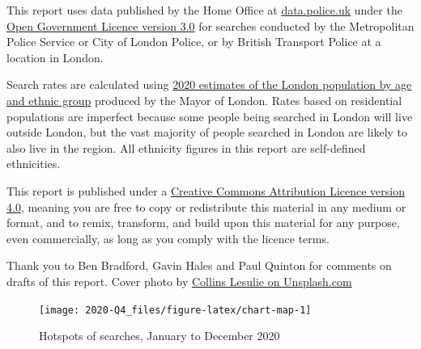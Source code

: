 \documentclass[
  a4paper,
  twoside, 11pt]{article}
\begin{document}
This report uses data published by the Home Office at \href{https://data.police.uk/}{data.police.uk} under the \href{https://www.nationalarchives.gov.uk/doc/open-government-licence/version/3/}{Open Government Licence version 3.0} for searches conducted by the Metropolitan Police Service or City of London Police, or by British Transport Police at a location in London.

Search rates are calculated using \href{https://data.london.gov.uk/dataset/ethnic-group-population-projections}{2020 estimates of the London population by age and ethnic group} produced by the Mayor of London. Rates based on residential populations are imperfect because some people being searched in London will live outside London, but the vast majority of people searched in London are likely to also live in the region. All ethnicity figures in this report are self-defined ethnicities.

This report is published under a \href{https://creativecommons.org/licenses/by/4.0/}{Creative Commons Attribution Licence version 4.0}, meaning you are free to copy or redistribute this material in any medium or format, and to remix, transform, and build upon this material for any purpose, even commercially, as long as you comply with the licence terms.

Thank you to Ben Bradford, Gavin Hales and Paul Quinton for comments on drafts of this report. Cover photo by \href{https://unsplash.com/photos/eBJrKE3gng8}{Collins Lesulie on Unsplash.com}




\begin{figure}[tb]

{\centering \texttt{[image: 2020-Q4\_files/figure-latex/chart-map-1]} 

}

\caption{Hotspots of searches, January to December 2020}\label{fig:chart-map}
\end{figure}
\end{document}
